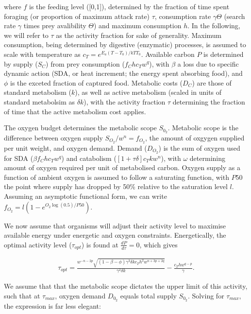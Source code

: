 \documentclass{article}
\begin{document}
where $f$ is the feeding level ([0,1]), determined by the fraction of time spent foraging (or proportion of maximum attack rate) $\tau$, consumption rate $\gamma\Theta$ (search rate $\gamma$ times prey avalibility $\Theta$) and maximum consumption $h$. In the following, we will refer to $\tau$ as the activity fraction for sake of generality. Maximum consumption, being determined by digestive (enzymatic) processes, is assumed to scale with temperature as $c_T = e^{E_a(T-T_0)/kTT_0}$. Available carbon $P$ is determined by supply ($S_C$) from prey consumption ($f_C h c_T w^q$), with $\beta$ a loss due to specific dynamic action (SDA, or heat increment; the energy spent absorbing food), and $\phi$ is the exceted fraction of captured food. Metabolic costs ($D_C$) are those of standard metabolism ($k$), as well as active metabolism (scaled in units of standard metabolsim as $\delta k$), with the activity fraction $\tau$ determining the fraction of time that the active metabolism cost applies.

The oxygen budget determines the metabolic scope $S_{0_2}$. Metabolic scope is the difference between oxygen supply $S_{O_2}/w^n=f_{O_2}$, the amount of oxgygen supplied per unit weight, and oxygen demand. Demand ($D_{O_2}$) is the sum of oxygen used for SDA ($\beta f_C h c_T w^q$) and catabolism ($[1+\tau \delta] c_T k w^n$), with $\omega$ determining amount of oxygen required per unit of metabolised carbon. Oxygen supply as a function of ambient oxygen is assumed to follow a saturating function, with $P50$ the point where supply has dropped by 50\% relative to the saturation level $l$. Assuming an asymptotic functional form, we can write $f_{O_2}=l(1-e^{O_2\log(0.5)/P50})$.

We now assume that organisms will adjust their activity level to maximise available energy under energetic and oxygen constraints. Energetically, the optimal activity level ($\tau_{opt}$) is found at $\frac{dP}{d\tau}=0$, which gives

\begin{align}
\tau_{opt} = \frac{w^{-n-2 p} \sqrt{(1-\beta-\phi)\gamma^3 \delta k c_T h^2  w^{n+3 p+2 q}}}{\gamma^2 \delta k}-\frac{c_T h w^{q-p}}{\gamma}.
\end{align}

We assume that that the metabolic scope dictates the upper limit of this activity, such that at $\tau_{max}$, oxygen demand $D_{0_2}$ equals total supply $S_{0_2}$. Solving for $\tau_{max}$, the expression is far less elegant:
\end{document}
